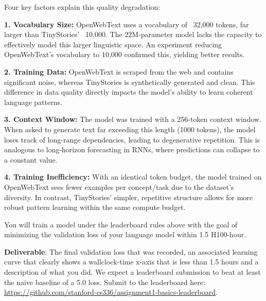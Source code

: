 \begin{answer}
Four key factors explain this quality degradation:

\textbf{1. Vocabulary Size:} OpenWebText uses a vocabulary of ~32,000 tokens, far larger than TinyStories' ~10,000. The 22M-parameter model lacks the capacity to effectively model this larger linguistic space. An experiment reducing OpenWebText's vocabulary to 10,000 confirmed this, yielding better results.

\textbf{2. Training Data:} OpenWebText is scraped from the web and contains significant noise, whereas TinyStories is synthetically generated and clean. This difference in data quality directly impacts the model's ability to learn coherent language patterns.

\textbf{3. Context Window:} The model was trained with a 256-token context window. When asked to generate text far exceeding this length (1000 tokens), the model loses track of long-range dependencies, leading to degenerative repetition. This is analogous to long-horizon forecasting in RNNs, where predictions can collapse to a constant value.

\textbf{4. Training Inefficiency:} With an identical token budget, the model trained on OpenWebText sees fewer examples per concept/task due to the dataset's diversity. In contrast, TinyStories' simpler, repetitive structure allows for more robust pattern learning within the same compute budget.

\end{answer}


You will train a model under the leaderboard rules above with the goal of minimizing the validation loss of your language model within 1.5 H100-hour.

\textbf{Deliverable}: The final validation loss that was recorded, an associated learning curve that clearly shows a wallclock-time x-axis that is less than 1.5 hours and a description of what you did. We expect a leaderboard submission to beat at least the naive baseline of a 5.0 loss. Submit to the leaderboard here: \url{https://github.com/stanford-cs336/assignment1-basics-leaderboard}.

\begin{answer}

\end{answer}

